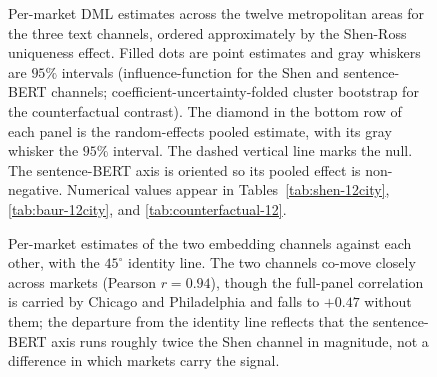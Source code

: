 \begin{figure}[H]
\caption{Per-market DML estimates across the twelve metropolitan areas for the
three text channels, ordered approximately by the Shen-Ross uniqueness effect. Filled dots are
point estimates and gray whiskers are $95\%$ intervals (influence-function for
the Shen and sentence-BERT channels; coefficient-uncertainty-folded cluster
bootstrap for the counterfactual contrast). The diamond in the bottom row of each
panel is the random-effects pooled estimate, with its gray whisker the $95\%$
interval. The dashed vertical line marks the
null. The sentence-BERT axis is oriented so its pooled effect is non-negative.
Numerical values appear in Tables~\ref{tab:shen-12city}, \ref{tab:baur-12city},
and \ref{tab:counterfactual-12}.}
\label{fig:forest-12}
\end{figure}

\begin{figure}[H]
\centering
{}
\caption{Per-market estimates of the two embedding channels against each other,
with the $45^\circ$ identity line. The two channels co-move closely
across markets (Pearson $r = 0.94$), though the full-panel correlation is carried
by Chicago and Philadelphia and falls to $+0.47$ without them; the departure
from the identity line reflects that the sentence-BERT axis runs roughly twice the
Shen channel in magnitude, not a difference in which markets carry the signal.}
\label{fig:concordance}
\end{figure}
